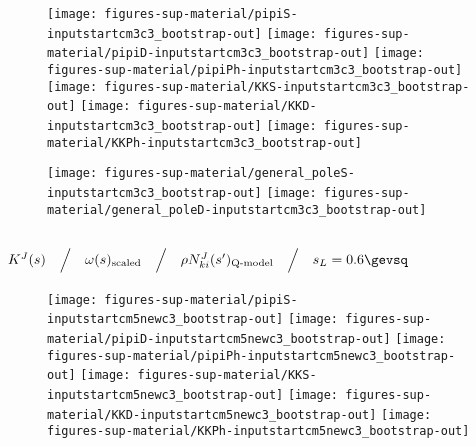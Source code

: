 



\begin{figure}[h]
\centering\texttt{[image: figures-sup-material/pipiS-inputstartcm3c3\_bootstrap-out]} \texttt{[image: figures-sup-material/pipiD-inputstartcm3c3\_bootstrap-out]} \texttt{[image: figures-sup-material/pipiPh-inputstartcm3c3\_bootstrap-out]}
\texttt{[image: figures-sup-material/KKS-inputstartcm3c3\_bootstrap-out]} \texttt{[image: figures-sup-material/KKD-inputstartcm3c3\_bootstrap-out]} \texttt{[image: figures-sup-material/KKPh-inputstartcm3c3\_bootstrap-out]}
\end{figure}

\begin{figure}[h]
\centering\texttt{[image: figures-sup-material/general\_poleS-inputstartcm3c3\_bootstrap-out]} \texttt{[image: figures-sup-material/general\_poleD-inputstartcm3c3\_bootstrap-out]}
\end{figure}



\clearpage

\subsection{$K^J(s) \quad\Big/\quad \omega(s)_\text{scaled} \quad\Big/\quad \rho N^J_{ki}(s')_\text{Q-model} \quad\Big/\quad s_L = 0.6\gevsq$}
\label{subsec:inputstartcm5newc3_bootstrap-out}






\begin{figure}[h]
\centering\texttt{[image: figures-sup-material/pipiS-inputstartcm5newc3\_bootstrap-out]} \texttt{[image: figures-sup-material/pipiD-inputstartcm5newc3\_bootstrap-out]} \texttt{[image: figures-sup-material/pipiPh-inputstartcm5newc3\_bootstrap-out]}
\texttt{[image: figures-sup-material/KKS-inputstartcm5newc3\_bootstrap-out]} \texttt{[image: figures-sup-material/KKD-inputstartcm5newc3\_bootstrap-out]} \texttt{[image: figures-sup-material/KKPh-inputstartcm5newc3\_bootstrap-out]}
\end{figure}

